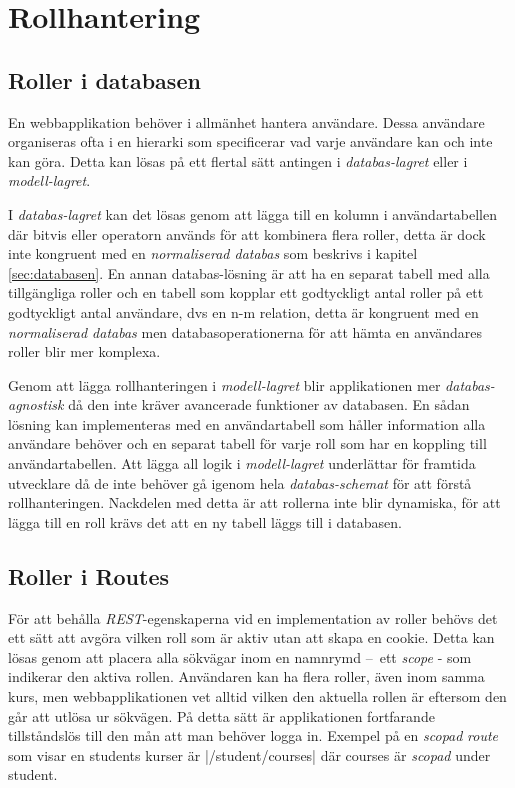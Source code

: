 \section{Rollhantering}

\subsection{Roller i databasen}

En webbapplikation behöver i allmänhet hantera användare. Dessa användare organiseras ofta i en hierarki som specificerar vad varje användare kan och inte kan göra. Detta kan lösas på ett flertal sätt antingen i \emph{databas-lagret} eller i \emph{modell-lagret}.

I \emph{databas-lagret} kan det lösas genom att lägga till en kolumn i användartabellen där bitvis eller 
operatorn används för att kombinera flera roller, detta är dock inte kongruent med en \emph{normaliserad databas} som beskrivs i kapitel \ref{sec:databasen}. En annan databas-lösning är att ha en separat tabell med alla tillgängliga roller och en tabell som kopplar ett godtyckligt antal roller på ett godtyckligt antal användare, dvs en n-m relation, detta är kongruent med en \emph{normaliserad databas} men databasoperationerna för att hämta en användares roller blir mer komplexa.

Genom att lägga rollhanteringen i \emph{modell-lagret} blir applikationen mer \emph{databas-agnostisk} då den inte kräver avancerade funktioner av databasen. En sådan lösning kan implementeras med en användartabell som håller information alla användare behöver och en separat tabell för varje roll som har en koppling till användartabellen. Att lägga all logik i \emph{modell-lagret} underlättar för framtida utvecklare då de inte behöver gå igenom hela \emph{databas-schemat} för att förstå rollhanteringen. Nackdelen med detta är att rollerna inte blir dynamiska, för att lägga till en roll krävs det att en ny tabell läggs till i databasen.

\subsection{Roller i Routes}

För att behålla \emph{REST}-egenskaperna vid en implementation av roller behövs det ett sätt att avgöra vilken roll som är aktiv utan att skapa en cookie. Detta kan lösas genom att placera alla sökvägar inom en namnrymd – ett \emph{scope} - som indikerar den aktiva rollen. Användaren kan ha flera roller, även inom samma kurs, men webbapplikationen vet alltid vilken den aktuella rollen är eftersom den går att utlösa ur sökvägen. På detta sätt är applikationen fortfarande tillståndslös till den mån att man behöver logga in.
Exempel på en \emph{scopad} \emph{route} som visar en students kurser är |/student/courses| där courses är \emph{scopad} under student.

